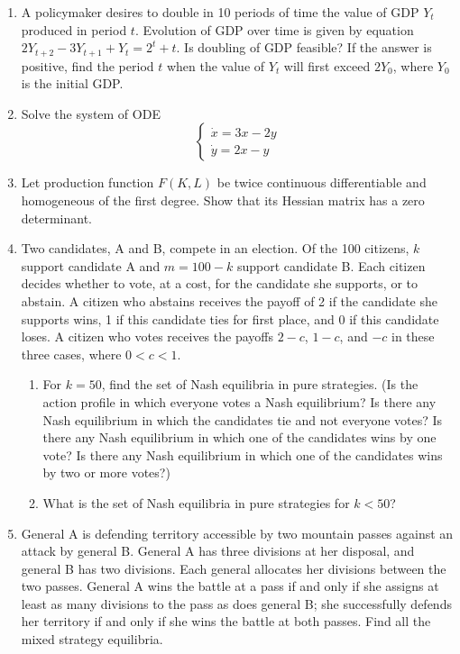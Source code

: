\documentclass[a4paper]{article}
\begin{document}
\begin{enumerate}

\item A policymaker desires to double in 10 periods of time the value of GDP $Y_t$ produced in period $t$. Evolution of GDP over time is given by equation $2Y_{t+2}-3Y_{t+1}+Y_t=2^t+t$. Is doubling of GDP feasible? If the answer is positive,  find the period $t$ when the value of $Y_t$ will first exceed $2Y_0$, where $Y_0$ is the initial GDP.

\item  Solve the system of ODE
\[
\begin{cases}
\dot{x}=3x-2y \\
\dot{y}=2x-y
\end{cases}
\]




\item  Let production function $F(K, L)$ be twice continuous differentiable and homogeneous of the first degree. Show that its Hessian matrix has a zero determinant.

\item  Two candidates, A and B, compete in an election. Of the 100 citizens, $k$ support candidate A and $m= 100 - k$ support candidate B. Each citizen decides whether to vote, at a cost, for the candidate she supports, or to abstain. A citizen who abstains receives the payoff of 2 if the candidate she supports wins, 1 if this candidate ties for first place, and 0 if this candidate loses. A citizen who votes receives the payoffs $2 - c$, $1 - c$, and $-c$ in these three cases, where $0 < c < 1$.
\begin{enumerate}
\item  For $k = 50$, find the set of Nash equilibria in pure strategies. (Is the action profile in which everyone votes a Nash equilibrium? Is there any Nash equilibrium in which the candidates tie and not everyone votes? Is there any Nash equilibrium in which one of the candidates wins by one vote? Is there any Nash equilibrium in which one of the candidates wins by two or more votes?)
\item  What is the set of Nash equilibria in pure strategies for $k < 50$?
\end{enumerate} 

\item General A is defending territory accessible by two mountain passes against an attack by general B. General A has three divisions at her disposal, and general B has two divisions. Each general allocates her divisions between the two passes. General A wins the battle at a pass if and only if she assigns at least as many divisions to the pass as does general B; she successfully defends her territory if and only if she wins the battle at both passes. Find all the mixed strategy equilibria.


\end{enumerate}
\end{document}
